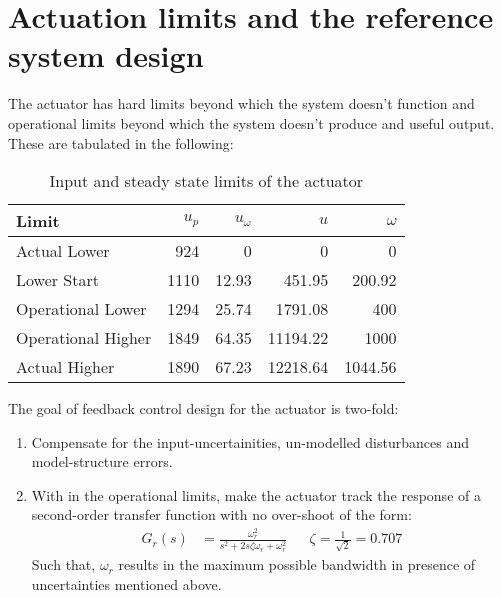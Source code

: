 \section{Actuation limits and the reference system design}
The actuator has hard limits beyond which the system doesn't function and
operational limits beyond which the system doesn't produce and useful output.
These are tabulated in the following:
\begin{table}[H]
    \centering
    \begin{tabular}{l r r r r}
        \hline \hline
        Limit & $u_p$ & $u_{\omega}$ & $u$ & $\omega$ \\ \hline \hline
        Actual Lower         & 924  & 0     & 0        & 0\\
        Lower Start          & 1110 & 12.93 & 451.95   & 200.92 \\
        Operational Lower    & 1294 & 25.74 & 1791.08  & 400 \\
        Operational Higher   & 1849 & 64.35 & 11194.22 & 1000\\
        Actual Higher        & 1890 & 67.23 & 12218.64 &  1044.56\\
        \hline \hline
    \end{tabular}
    \caption{Input and steady state limits of the actuator}
\end{table}



The goal of feedback control design for the actuator is two-fold:
\begin{enumerate}
\item Compensate for the input-uncertainities, un-modelled disturbances and
model-structure errors.
\item With in the operational limits, make the actuator track the response of a second-order transfer function
with no over-shoot of the form:
\begin{align*}
    G_{r}(s) &= \frac{\omega_{r}^2}{s^2 + 2s \zeta \omega_{r} + \omega_{r}^2}
    && \zeta = \frac{1}{\sqrt{2}} = 0.707
\end{align*}
Such that, $\omega_{r}$ results in the maximum possible bandwidth in presence
of uncertainties mentioned above.
\end{enumerate}

